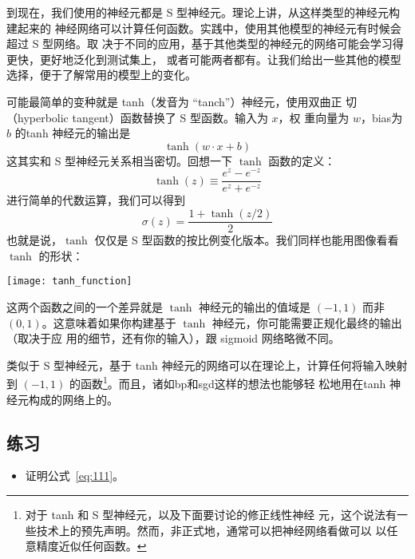 到现在，我们使用的神经元都是 S 型神经元。理论上讲，从这样类型的神经元构建起来的
神经网络可以计算任何函数。实践中，使用其他模型的神经元有时候会超过 S 型网络。取
决于不同的应用，基于其他类型的神经元的网络可能会学习得更快，更好地泛化到测试集上，
或者可能两者都有。让我们给出一些其他的模型选择，便于了解常用的模型上的变化。

可能最简单的变种就是 tanh（发音为 “tanch”）神经元，使用双曲正
切（hyperbolic tangent）函数替换了 S 型函数。输入为 $x$，权
重向量为 $w$，\gls*{bias}为 $b$ 的tanh 神经元的输出是
\begin{equation}
  \tanh(w \cdot x+b)
  \label{eq:109}\tag{109}
\end{equation}
这其实和 S 型神经元关系相当密切。回想一下 $\tanh$ 函数的定义：
\begin{equation}
  \tanh(z) \equiv \frac{e^z-e^{-z}}{e^z+e^{-z}}
  \label{eq:110}\tag{110}
\end{equation}
进行简单的代数运算，我们可以得到
\begin{equation} 
  \sigma(z) = \frac{1+\tanh(z/2)}{2}
  \label{eq:111}\tag{111}
\end{equation}
也就是说，$\tanh$ 仅仅是 S 型函数的按比例变化版本。我们同样也能用图像看看
$\tanh$ 的形状：
\begin{center}
  \texttt{[image: tanh\_function]}
\end{center}

这两个函数之间的一个差异就是 $\tanh$ 神经元的输出的值域是 $(-1, 1)$ 而非 $(0,
1)$。这意味着如果你构建基于 $\tanh$ 神经元，你可能需要正规化最终的输出（取决于应
  用的细节，还有你的输入），跟 sigmoid 网络略微不同。

类似于 S 型神经元，基于 tanh 神经元的网络可以在理论上，计算任何将输入映射到
$(-1, 1)$ 的函数\footnote{对于 tanh 和 S 型神经元，以及下面要讨论的修正线性神经
  元，这个说法有一些技术上的预先声明。然而，非正式地，通常可以把神经网络看做可以
  以任意精度近似任何函数。}。而且，诸如\gls*{bp}和\gls*{sgd}这样的想法也能够轻
松地用在tanh 神经元构成的网络上的。

\subsection*{练习}

\begin{itemize}
\item 证明公式~\eqref{eq:111}。
\end{itemize}

